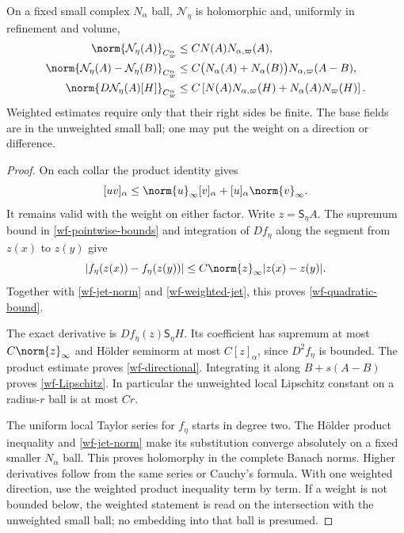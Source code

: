 \begin{theorem}\label{wf-nonlinear-theorem}
On a fixed small complex $N_\alpha$ ball, $\mathcal N_\eta$
is holomorphic and, uniformly in refinement and volume,
\begin{align}
 \norm{\mathcal N_\eta(A)}_{C^\alpha_\varpi}
       &\le C N(A)N_{\alpha,\varpi}(A),
                                           \label{wf-quadratic-bound}\\
 \norm{\mathcal N_\eta(A)-\mathcal N_\eta(B)}_{C^\alpha_\varpi}
       &\le C\bigl(N_\alpha(A)+N_\alpha(B)\bigr)
                             N_{\alpha,\varpi}(A-B),
                                           \label{wf-Lipschitz}\\
 \norm{D\mathcal N_\eta(A)[H]}_{C^\alpha_\varpi}
       &\le C\left[N(A)N_{\alpha,\varpi}(H)
                         +N_\alpha(A)N_\varpi(H)\right].
                                           \label{wf-directional}
\end{align}
Weighted estimates require only that their right sides be
finite. The base fields are in the unweighted small ball;
one may put the weight on a direction or difference.
\end{theorem}

\begin{proof}
On each collar the product identity gives
\[
 [uv]_\alpha\le\norm{u}_\infty[v]_\alpha
                         +[u]_\alpha\norm{v}_\infty.
\]
It remains valid with the weight on either factor.
Write $z=\mathsf S_\eta A$. The supremum bound in
\eqref{wf-pointwise-bounds} and integration of $Df_\eta$
along the segment from $z(x)$ to $z(y)$ give
\[
 |f_\eta(z(x))-f_\eta(z(y))|
       \le C\norm{z}_\infty|z(x)-z(y)|.
\]
Together with \eqref{wf-jet-norm} and
\eqref{wf-weighted-jet}, this proves
\eqref{wf-quadratic-bound}.

The exact derivative is
$Df_\eta(z)\mathsf S_\eta H$. Its coefficient has supremum
at most $C\norm{z}_\infty$ and H\"older seminorm at most
$C[z]_\alpha$, since $D^2f_\eta$ is bounded. The product
estimate proves \eqref{wf-directional}. Integrating it
along $B+s(A-B)$ proves \eqref{wf-Lipschitz}. In particular
the unweighted local Lipschitz constant on a radius-$r$
ball is at most $Cr$.

The uniform local Taylor series for $f_\eta$ starts in
degree two. The H\"older product inequality and
\eqref{wf-jet-norm} make its substitution converge
absolutely on a fixed smaller $N_\alpha$ ball. This proves
holomorphy in the complete Banach norms. Higher derivatives
follow from the same series or Cauchy's formula. With one
weighted direction, use the weighted product inequality
term by term. If a weight is not bounded below, the weighted
statement is read on the intersection with the unweighted
small ball; no embedding into that ball is presumed.
\end{proof}

